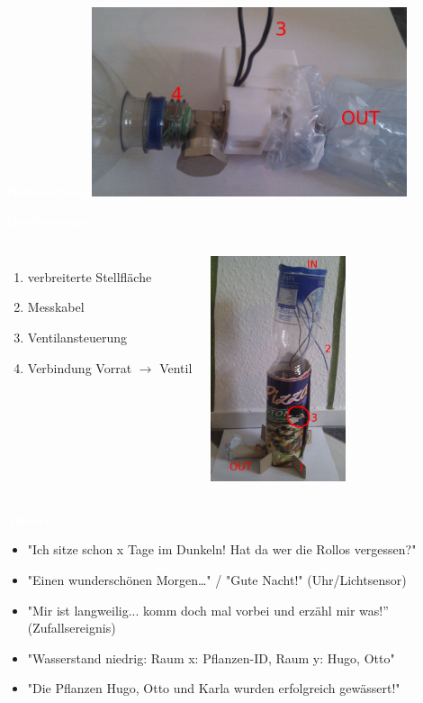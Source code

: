 \documentclass[bigger]{beamer}
\newcommand{\topic}[1]{{\huge{\textcolor{white}{\textbf{#1}}}}}
\begin{document}
\begin{frame}{\topic{Bewässerung}}
       \includegraphics[width=350px]{Anschluss.jpg}
\end{frame}

\begin{frame}{\topic{Bewässerung}}
    \begin{columns}
        \begin{enumerate}
			\item verbreiterte Stellfläche
			\item Messkabel
			\item Ventilansteuerung
			\item Verbindung Vorrat $\rightarrow$ Ventil
        \end{enumerate}
        \includegraphics[width=150px]{System.jpg}
    \end{columns}
\end{frame} 

\begin{frame}{\topic{Tweets}}
	\begin{itemize}
		\item "Ich sitze schon x Tage im Dunkeln! Hat da wer die Rollos vergessen?"
		\item "Einen wunderschönen Morgen…" / "Gute Nacht!" (Uhr/Lichtsensor)
		\item "Mir ist langweilig... komm doch mal vorbei und erzähl mir was!” (Zufallsereignis)
		\item "Wasserstand niedrig: Raum x: Pflanzen-ID, Raum y: Hugo, Otto"
		\item "Die Pflanzen Hugo, Otto und Karla wurden erfolgreich gewässert!"
	\end{itemize}
\end{frame}
\end{document}
